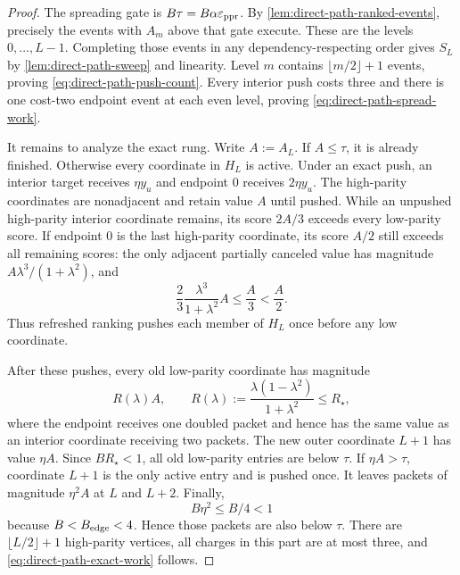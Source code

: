 \begin{proof}
The spreading gate is $B\tau=B\alpha\varepsilon_{\mathrm{ppr}}$. By
\cref{lem:direct-path-ranked-events}, precisely the events with $A_m$ above
that gate execute. These are the levels $0,\ldots,L-1$. Completing those
events in any dependency-respecting order gives $S_L$ by
\cref{lem:direct-path-sweep} and linearity. Level $m$ contains
$\lfloor m/2\rfloor+1$ events, proving
\cref{eq:direct-path-push-count}. Every interior push costs three and there
is one cost-two endpoint event at each even level, proving
\cref{eq:direct-path-spread-work}.

It remains to analyze the exact rung. Write $A:=A_L$. If $A\leq\tau$, it is
already finished. Otherwise every coordinate in $H_L$ is active. Under an
exact push, an interior target receives $\eta y_u$ and endpoint $0$ receives
$2\eta y_u$. The high-parity coordinates are nonadjacent and retain value
$A$ until pushed. While an unpushed high-parity interior coordinate remains,
its score $2A/3$ exceeds every low-parity score. If endpoint $0$ is the last
high-parity coordinate, its score $A/2$ still exceeds all remaining scores:
the only adjacent partially canceled value has magnitude
$A\lambda^3/(1+\lambda^2)$, and
\begin{equation*}
 \frac23\frac{\lambda^3}{1+\lambda^2}A\leq\frac A3<\frac A2.
\end{equation*}
Thus refreshed ranking pushes each member of $H_L$ once before any low
coordinate.

After these pushes, every old low-parity coordinate has magnitude
\begin{equation}
 R(\lambda)A,
 \qquad
 R(\lambda):=\frac{\lambda(1-\lambda^2)}{1+\lambda^2}
 \leq R_\star,
 \label{eq:direct-path-terminal-ratio}
\end{equation}
where the endpoint receives one doubled packet and hence has the same value
as an interior coordinate receiving two packets. The new outer coordinate
$L+1$ has value $\eta A$. Since $BR_\star<1$, all old low-parity entries are
below $\tau$. If $\eta A>\tau$, coordinate $L+1$ is the only active entry
and is pushed once. It leaves packets of magnitude $\eta^2A$ at $L$ and
$L+2$. Finally,
\begin{equation*}
 B\eta^2\leq B/4<1
\end{equation*}
because $B<B_{\rm edge}<4$. Hence those packets are also below $\tau$.
There are $\lfloor L/2\rfloor+1$ high-parity vertices, all charges in this
part are at most three, and \cref{eq:direct-path-exact-work} follows.
\end{proof}

